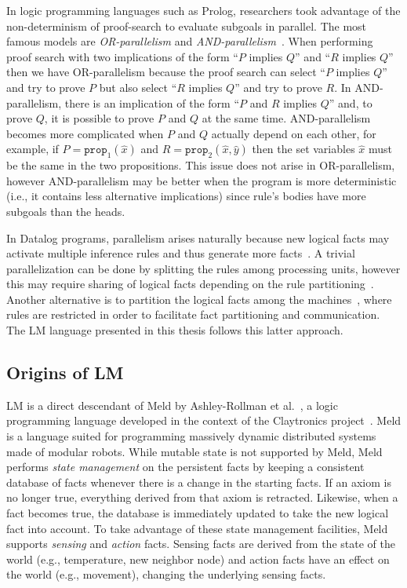 In logic programming languages such as Prolog, researchers took advantage of the
non-determinism of proof-search to evaluate subgoals in parallel. The most
famous models are \emph{OR-parallelism} and
\emph{AND-parallelism}~\cite{Gupta:2001:PEP:504083.504085}. When performing
proof search with two implications of the form ``$P$ implies $Q$'' and ``$R$
implies $Q$'' then we have OR-parallelism because the proof search can select
``$P$ implies $Q$'' and try to prove $P$ but also select ``$R$ implies $Q$'' and
try to prove $R$. In AND-parallelism, there is an implication of the form ``$P$
and $R$ implies $Q$'' and, to prove $Q$, it is possible to prove $P$ and $Q$ at
the same time. AND-parallelism becomes more complicated when $P$ and $Q$
actually depend on each other, for example, if $P = \mathtt{prop}_1(\hat{x})$
and $R = \mathtt{prop}_2(\hat{x}, \hat{y})$ then the set variables $\hat{x}$
must be the same in the two propositions. This issue does not arise in
OR-parallelism, however AND-parallelism may be better when the program is more
deterministic (i.e., it contains less alternative implications) since rule's
bodies have more subgoals than the heads.

In Datalog programs, parallelism arises naturally because new logical facts may
activate multiple inference rules and thus generate more
facts~\cite{Ganguly:1990:FPP:93597.98724,Seib:1991:PDP:113413.113435,Wolfson:1988:DPL:971701.50242}.
A trivial parallelization can be done by splitting the rules among processing
units, however this may require sharing of logical facts depending on the rule
partitioning~\cite{Wolfson:1988:DPL:971701.50242}. Another alternative is to
partition the logical facts among the
machines~\cite{183073,Loo-condie-garofalakis-p2}, where rules are restricted in
order to facilitate fact partitioning and communication. The LM language
presented in this thesis follows this latter approach.

\subsection{Origins of LM}

LM is a direct descendant of Meld by Ashley-Rollman et
al.~\cite{ashley-rollman-iclp09,ashley-rollman-derosa-iros07wksp}, a logic
programming language developed in the context of the Claytronics
project~\cite{goldstein-computer05}. Meld is a language suited for programming
massively dynamic distributed systems made of modular robots. While mutable
state is not supported by Meld, Meld performs \emph{state management} on the
persistent facts by keeping a consistent database of facts whenever there is a
change in the starting facts. If an axiom is no longer true, everything derived
from that axiom is retracted. Likewise, when a fact becomes true, the database
is immediately updated to take the new logical fact into account. To take
advantage of these state management facilities, Meld supports \emph{sensing} and
\emph{action} facts. Sensing facts are derived from the state of the world
(e.g., temperature, new neighbor node) and action facts have an
effect on the world (e.g., movement), changing the underlying sensing facts.


